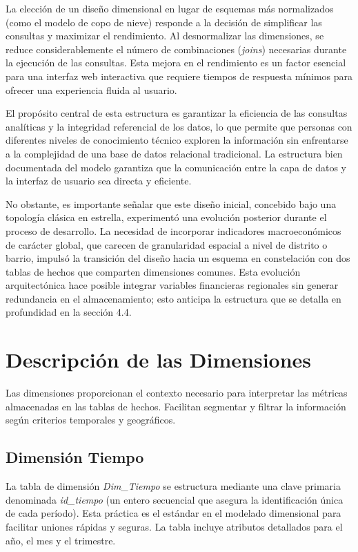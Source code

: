 \documentclass[a4paper,11pt,openany]{book}
\begin{document}
La elección de un diseño dimensional en lugar de esquemas más normalizados (como el modelo de copo de nieve) responde a la decisión de simplificar las consultas y maximizar el rendimiento. Al desnormalizar las dimensiones, se reduce considerablemente el número de combinaciones (\textit{joins}) necesarias durante la ejecución de las consultas. Esta mejora en el rendimiento es un factor esencial para una interfaz web interactiva que requiere tiempos de respuesta mínimos para ofrecer una experiencia fluida al usuario.

El propósito central de esta estructura es garantizar la eficiencia de las consultas analíticas y la integridad referencial de los datos, lo que permite que personas con diferentes niveles de conocimiento técnico exploren la información sin enfrentarse a la complejidad de una base de datos relacional tradicional. La estructura bien documentada del modelo garantiza que la comunicación entre la capa de datos y la interfaz de usuario sea directa y eficiente.

No obstante, es importante señalar que este diseño inicial, concebido bajo una topología clásica en estrella, experimentó una evolución posterior durante el proceso de desarrollo. La necesidad de incorporar indicadores macroeconómicos de carácter global, que carecen de granularidad espacial a nivel de distrito o barrio, impulsó la transición del diseño hacia un esquema en constelación con dos tablas de hechos que comparten dimensiones comunes. Esta evolución arquitectónica hace posible integrar variables financieras regionales sin generar redundancia en el almacenamiento; esto anticipa la estructura que se detalla en profundidad en la sección 4.4.

\section{Descripción de las Dimensiones}
Las dimensiones proporcionan el contexto necesario para interpretar las métricas almacenadas en las tablas de hechos. Facilitan segmentar y filtrar la información según criterios temporales y geográficos.

\subsection{Dimensión Tiempo}
La tabla de dimensión \textit{Dim\_Tiempo} se estructura mediante una clave primaria denominada \textit{id\_tiempo} (un entero secuencial que asegura la identificación única de cada período). Esta práctica es el estándar en el modelado dimensional para facilitar uniones rápidas y seguras. La tabla incluye atributos detallados para el año, el mes y el trimestre.
\end{document}
